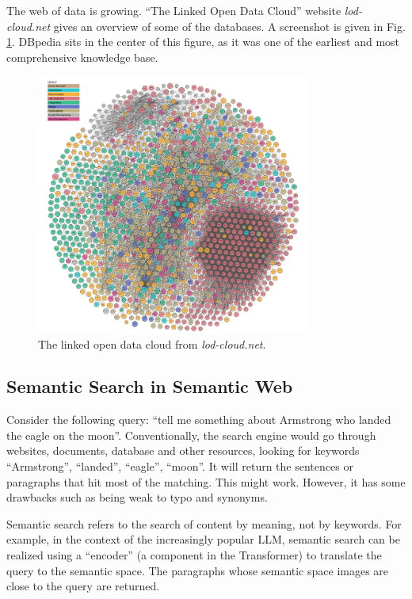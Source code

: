 The web of data is growing. ``The Linked Open Data Cloud'' website \textit{lod-cloud.net} gives an overview of some of the databases. A screenshot is given in Fig. \ref{fig:webofdata}. DBpedia sits in the center of this figure, as it was one of the earliest and most comprehensive knowledge base. 
\begin{figure}[htbp]
	\centering
	\includegraphics[width=0.8\textwidth]{chapters/part-4/figures/webofdata.png}
	\caption{The linked open data cloud from \textit{lod-cloud.net}.}
	\label{fig:webofdata}
\end{figure}

\subsection{Semantic Search in Semantic Web}

Consider the following query: ``tell me something about Armstrong who landed the eagle on the moon''. Conventionally, the search engine would go through websites, documents, database and other resources, looking for keywords ``Armstrong'', ``landed'', ``eagle'', ``moon''. It will return the sentences or paragraphs that hit most of the matching. This might work. However, it has some drawbacks such as being weak to typo and synonyms.

Semantic search refers to the search of content by meaning, not by keywords. For example, in the context of the increasingly popular LLM, semantic search can be realized using a ``encoder'' (a component in the Transformer) to translate the query to the semantic space. The paragraphs whose semantic space images are close to the query are returned.

